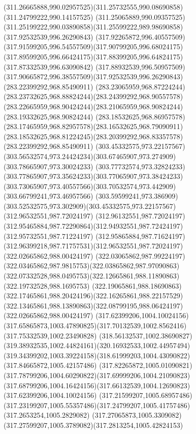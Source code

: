 {{\curveto(311.26665888,990.02957525)(311.25732555,990.08690858)(311.24799222,990.14157525)
\curveto(311.25065889,990.09357525)(311.25199222,990.03890858)(311.25599222,989.98690858)
\moveto(317.92532539,996.26290843)
\curveto(317.92265872,996.40557509)(317.91599205,996.54557509)(317.90799205,996.68024175)
\curveto(317.89599205,996.66424175)(317.88399205,996.64824175)(317.87332539,996.63090842)
\curveto(317.88932539,996.50957509)(317.90665872,996.38557509)(317.92532539,996.26290843)
\moveto(283.22399292,968.85490911)
\curveto(283.23065959,968.87224244)(283.23732625,968.88824244)(283.24399292,968.90557578)
\curveto(283.22665959,968.90424244)(283.21065959,968.90824244)(283.19332625,968.90824244)
\curveto(283.18532625,968.86957578)(283.17465959,968.82957578)(283.16532625,968.79090911)
\curveto(283.18532625,968.81224245)(283.20399292,968.83357578)(283.22399292,968.85490911)
\moveto(303.45332575,973.22157567)
\curveto(303.56532574,973.24424234)(303.67465907,973.274909)(303.78665907,973.30024233)
\curveto(303.77732574,973.32824233)(303.77865907,973.35624233)(303.77065907,973.38424233)
\curveto(303.73065907,973.40557566)(303.70532574,973.442909)(303.66799241,973.46957566)
\curveto(303.59599241,973.386909)(303.52532575,973.302909)(303.45332575,973.22157567)
\moveto(312.96532551,987.72024197)
\curveto(312.96132551,987.72024197)(312.95465884,987.72290864)(312.94932551,987.72424197)
\lineto(312.95732551,987.71224197)
\curveto(312.95865884,987.71624197)(312.96399218,987.71757531)(312.96532551,987.72024197)
\moveto(322.02665862,988.00424197)
\curveto(322.03065862,987.99224197)(322.03465862,987.9815753)(322.03865862,987.97090863)
\curveto(322.07332528,988.0495753)(322.12665861,988.11890863)(322.19732528,988.1695753)
\curveto(322.19065861,988.18690863)(322.17465861,988.20424196)(322.16265861,988.22157529)
\curveto(322.13465861,988.13890863)(322.08799195,988.06424197)(322.02665862,988.00424197)
\moveto(317.62399206,1004.10024156)
\curveto(317.65865873,1003.47890825)(317.70132539,1002.8562416)(317.75332539,1002.23490828)
\curveto(318.56132537,1002.38690827)(319.38932535,1002.44824161)(320.16932533,1002.44957494)
\curveto(319.34399202,1003.39224158)(318.61999203,1004.43090822)(317.84665872,1005.42157486)
\curveto(317.82265872,1005.01090821)(317.78799206,1004.60290822)(317.69999206,1004.21090823)
\curveto(317.68799206,1004.16424156)(317.66132539,1004.12690823)(317.62399206,1004.10024156)
\moveto(317.21599207,1005.68957486)
\curveto(317.23199207,1005.55357486)(317.24799207,1005.41757486)(317.2653254,1005.2829082)
\curveto(317.27065873,1005.3309082)(317.27599207,1005.3789082)(317.2813254,1005.42824153)
}}
